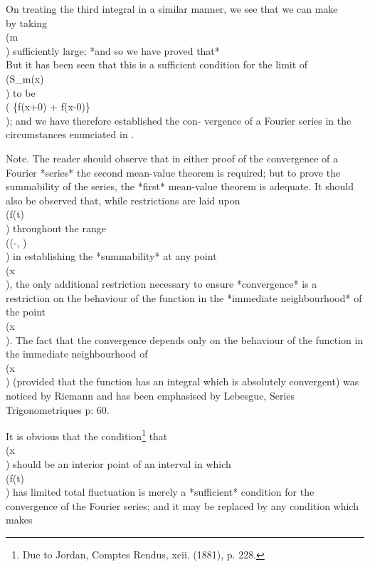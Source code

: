 On treating the third integral in a similar manner, we see that we can
make
\\[ 
\left| \, 
  \int_{0}^{\frac{1}{2}\delta}\!
  \frac{\sin (2m+1)\theta}{\sin \theta}
  \phi(\theta)
  \, d \theta
 \, \right| 
<
(4B+1) \eps
\\] 
by taking \\(m\\) sufficiently large; *and so we have proved that*
\\[ 
\lim_{m \rightarrow \infty}
\int_{0}^{\frac{1}{2}\pi}\!
\frac{\sin (2m+1)\theta}{\sin \theta}
\phi(\theta)
\, d \theta
=
0.
\\] 
But it has been seen that this is a sufficient condition for the limit
of \\(S_{m}(x)\\) to be \\( \left\{f(x+0) + f(x-0)\right\}\\); and we have therefore
established the con- vergence of a Fourier series in the circumstances
enunciated in .

Note. The reader should observe that in either proof of the
convergence of a Fourier *series* the second mean-value theorem is
required; but to prove the summability of the series, the *first*
mean-value theorem is adequate. It should also be observed that, while
restrictions are laid upon \\(f(t)\\) throughout the range \\((-\pi, \pi)\\) in
establishing the *summability* at any point \\(x\\), the only additional
restriction necessary to ensure *convergence* is a restriction on the
behaviour of the function in the *immediate neighbourhood* of the point
\\(x\\). The fact that the convergence depends only on the behaviour of the
function in the immediate neighbourhood of \\(x\\) (provided that the
function has an integral which is absolutely convergent) was noticed
by Riemann and has been emphasised by Lebesgue,
Series Trigonometriques p: 60.

It is obvious that the condition\footnote{Due to Jordan, Comptes Rendus, xcii. (1881), p. 228.}
that \\(x\\) should be an interior point
of an interval in which \\(f(t)\\) has limited total fluctuation is merely a
*sufficient* condition for the convergence of the Fourier series; and
it may be replaced by any condition which makes
\\[ 
\lim_{m \rightarrow \infty}
\int_{0}^{\frac{1}{2}\pi}\!
\frac{\sin (2m+1)\theta}{\sin \theta}
\phi(\theta)
\, d \theta
=
0.
\\] 
%
%

